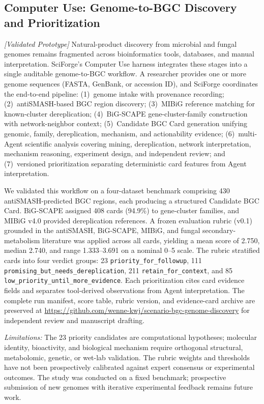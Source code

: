 \documentclass[sn-basic,Numbered,pdflatex]{sn-jnl}
\begin{document}
\FloatBarrier
\subsection{Computer Use: Genome-to-BGC Discovery and Prioritization}

\textit{[Validated Prototype]} Natural-product discovery from microbial and fungal genomes remains fragmented across bioinformatics tools, databases, and manual interpretation. SciForge's Computer Use harness integrates these stages into a single auditable genome-to-BGC workflow. A researcher provides one or more genome sequences (FASTA, GenBank, or accession ID), and SciForge coordinates the end-to-end pipeline: (1)~genome intake with provenance recording; (2)~antiSMASH-based BGC region discovery; (3)~MIBiG reference matching for known-cluster dereplication; (4)~BiG-SCAPE gene-cluster-family construction with network-neighbor context; (5)~Candidate BGC Card generation unifying genomic, family, dereplication, mechanism, and actionability evidence; (6)~multi-Agent scientific analysis covering mining, dereplication, network interpretation, mechanism reasoning, experiment design, and independent review; and (7)~versioned prioritization separating deterministic card features from Agent interpretation.

We validated this workflow on a four-dataset benchmark comprising 430 antiSMASH-predicted BGC regions, each producing a structured Candidate BGC Card. BiG-SCAPE assigned 408 cards (94.9\%) to gene-cluster families, and MIBiG v4.0 provided dereplication references. A frozen evaluation rubric (v0.1) grounded in the antiSMASH, BiG-SCAPE, MIBiG, and fungal secondary-metabolism literature was applied across all cards, yielding a mean score of 2.750, median 2.740, and range 1.333--3.691 on a nominal 0--5 scale. The rubric stratified cards into four verdict groups: 23 \texttt{priority\_for\_followup}, 111 \texttt{promising\_but\_needs\_dereplication}, 211 \texttt{retain\_for\_context}, and 85 \texttt{low\_priority\_until\_more\_evidence}. Each prioritization cites card evidence fields and separates tool-derived observations from Agent interpretation. The complete run manifest, score table, rubric version, and evidence-card archive are preserved at \url{https://github.com/wenne-kwj/scenario-bgc-genome-discovery} for independent review and manuscript drafting.

\textit{Limitations:} The 23 priority candidates are computational hypotheses; molecular identity, bioactivity, and biological mechanism require orthogonal structural, metabolomic, genetic, or wet-lab validation. The rubric weights and thresholds have not been prospectively calibrated against expert consensus or experimental outcomes. The study was conducted on a fixed benchmark; prospective submission of new genomes with iterative experimental feedback remains future work.
\end{document}
